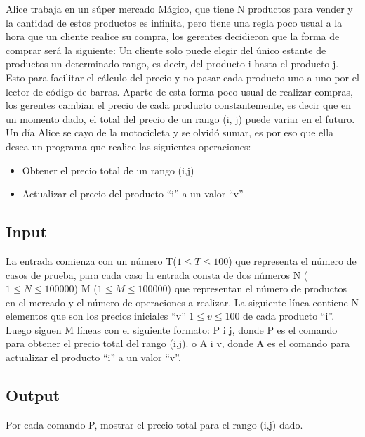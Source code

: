 
Alice trabaja en un súper mercado Mágico, que tiene N productos para vender y la cantidad de estos productos es infinita, pero tiene una regla poco usual a la hora que un cliente realice su compra, los gerentes decidieron que la forma de comprar será la siguiente:
Un cliente solo puede elegir del único estante de productos un determinado rango, es decir, del producto i hasta el producto j. Esto para facilitar el cálculo del precio y no pasar cada producto uno a uno por el lector de código de barras.
Aparte de esta forma poco usual de realizar compras, los gerentes cambian el precio de cada producto constantemente, es decir que en un momento dado, el total del precio de un rango (i, j) puede variar en el futuro.
Un día Alice se cayo de la motocicleta y se olvidó sumar, es por eso que ella desea un programa que realice las siguientes operaciones:

\begin{itemize}
  \item Obtener el precio total de un rango (i,j)
  \item Actualizar el precio del producto “i” a un valor “v”
\end{itemize}

\subsection*{Input}

La entrada comienza con un número T($1 \leq T \leq 100$) que representa el número de casos de prueba, para cada caso la entrada consta de dos números N ($1 \leq N \leq 100000$) M ($1 \leq M \leq 100000$) que representan el número de productos en el mercado y el número de operaciones a realizar. 
La siguiente línea contiene N elementos que son los precios iniciales “v” $1 \leq v \leq 100$ de cada producto “i”.
Luego siguen M líneas con el siguiente formato:
P i j, donde P es el comando para obtener el precio total del rango (i,j).
o
A i v, donde A es el comando para actualizar el producto “i” a un valor “v”.

\subsection*{Output}

Por cada comando P, mostrar el precio total para el rango (i,j) dado.

\datos

